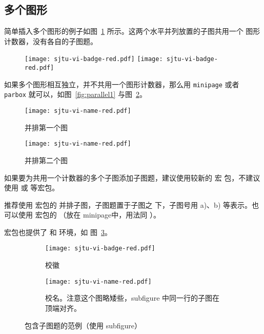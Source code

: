 \subsection{多个图形}

简单插入多个图形的例子如图~\ref{fig:SRR} 所示。这两个水平并列放置的子图共用一个
图形计数器，没有各自的子图题。

\begin{figure}[!htp]
  \centering
  \texttt{[image: sjtu-vi-badge-red.pdf]}
  \hspace{1cm}
  \texttt{[image: sjtu-vi-badge-red.pdf]}
  \label{fig:SRR}
\end{figure}

如果多个图形相互独立，并不共用一个图形计数器，那么用 \texttt{minipage} 或者
\texttt{parbox} 就可以，如图~\ref{fig:parallel1} 与图~\ref{fig:parallel2}。

\begin{figure}[!htp]
  \centering
  \begin{minipage}{0.48\textwidth}
    \centering
    \texttt{[image: sjtu-vi-name-red.pdf]}
    \caption{并排第一个图}
    \label{fig:parallel1}
  \end{minipage}\hfill
  \begin{minipage}{0.48\textwidth}
    \centering
    \texttt{[image: sjtu-vi-name-red.pdf]}
    \caption{并排第二个图}
    \label{fig:parallel2}
  \end{minipage}
\end{figure}

如果要为共用一个计数器的多个子图添加子图题，建议使用较新的  宏
包，不建议使用  或  等宏包。

推荐使用  宏包的  并排子图，子图题置于子图之
下，子图号用 a)、b) 等表示。也可以使用  宏包的 
（放在 minipage中，用法同 ）。

 宏包也提供了  和  环境，如
图~\ref{fig:subfigure}。

\begin{figure}[!htp]
  \centering
  \begin{subfigure}{0.3\textwidth}
    \centering
    \texttt{[image: sjtu-vi-badge-red.pdf]}
    \caption{校徽}
  \end{subfigure}
  \hspace{1cm}
  \begin{subfigure}{0.4\textwidth}
    \centering
    \texttt{[image: sjtu-vi-name-red.pdf]}
    \caption{校名。注意这个图略矮些，subfigure 中同一行的子图在顶端对齐。}
  \end{subfigure}
  \caption{包含子图题的范例（使用 subfigure）}
  \label{fig:subfigure}
\end{figure}

